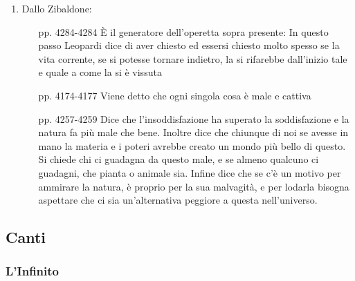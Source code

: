 \documentclass{article}
\begin{document}
\begin{enumerate}
    \item Dallo Zibaldone:
        \begin{itemize}
            \item[pp. 4284-4284] È il generatore dell'operetta sopra presente:
                In questo passo Leopardi dice di aver chiesto ed essersi chiesto molto spesso
                se la vita corrente, se si potesse tornare indietro, la si rifarebbe
                dall'inizio tale e quale a come la si è vissuta
            \item[pp. 4174-4177] Viene detto che ogni singola cosa è male e cattiva
            \item[pp. 4257-4259] Dice che l'insoddisfazione ha superato la soddisfazione e la natura fa 
            più male che bene. Inoltre dice che chiunque di noi se avesse in mano 
            la materia e i poteri avrebbe creato un mondo più bello di questo.
            Si chiede chi ci guadagna da questo male, e se almeno qualcuno ci 
            guadagni, che pianta o animale sia.
            Infine dice che se c'è un motivo per ammirare la natura, è proprio per la 
            sua malvagità, e per lodarla bisogna aspettare che ci sia un'alternativa 
            peggiore a questa nell'universo.
        \end{itemize}
\end{enumerate}

\newpage
\subsection{Canti}
\subsubsection{L'Infinito}

\end{document}
